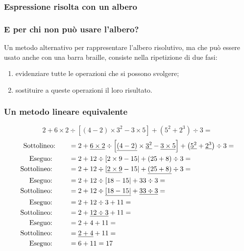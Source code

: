 \documentclass{beamer} %
\begin{document}
\begin{frame}\frametitle{Espressione risolta con un albero}

\espressionealberodia

\end{frame}


\begin{frame}\frametitle{E per chi non può usare l'albero?}

Un metodo alternativo per rappresentare l'albero risolutivo, 
ma che può essere usato anche con una barra braille, 
consiste nella ripetizione di due fasi:

\begin{enumerate} %
\item evidenziare tutte le operazioni che si possono svolgere;
\item sostituire a queste operazioni il loro risultato.
\end{enumerate}

\end{frame}


\begin{frame}\frametitle{Un metodo lineare equivalente}

\[2 + 6 \times 2 \div 
 \left[ \left(4 -2 \right) \times 3^{2} - 3 \times 5 \right] +
 \left( 5^{2} + 2^{3} \right) \div 3 =\]
\begin{align*}
\text{Sottolineo:} \qquad &= 2 + 
 \underline{6 \times 2} \div \left[ \underline{\left(4 -2 \right)} 
   \times \underline{3^{2}} - 
   \underline{3 \times 5} \right] +
 \left( \underline{5^{2}} + \underline{2^{3}} \right) \div 3 =\\
\text{Eseguo: } \qquad &= 2 + 
 12 \div \left[ 2 \times 9 - 15 \right| +
 \left( 25 + 8 \right) \div 3 =\\
\text{Sottolineo: } \qquad &= 2 + 
 12 \div \left[ \underline{2 \times 9} - 15 \right| +
 \underline{\left( 25 + 8 \right)} \div 3 = \hspace{20mm}\\ 
\text{Eseguo: } \qquad &= 2 + 12 \div \left[ 18 - 15 \right| +
 33 \div 3 =\\ 
\text{Sottolineo: } \qquad &= 2 + 
 12 \div \underline{\left[ 18 - 15 \right|} +
 \underline{33 \div 3} = \\ 
\text{Eseguo: } \qquad &= 2 + 
 12 \div 3 +
 11 = \\ 
\text{Sottolineo: } \qquad &= 2 + 
 \underline{12 \div 3} +
 11 = \\ 
\text{Eseguo: } \qquad &= 2 + 
 4 +
 11 = \\ 
\text{Sottolineo: } \qquad &= \underline{2 +  4} + 11 = \\ 
\text{Eseguo: } \qquad &= 6 + 11 = 17
\end{align*}

\end{frame}
\end{document}
